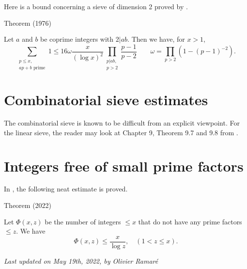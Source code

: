 \par 
Here is a bound concerning a sieve of dimension 2 proved by
\cite{Siebert*76}.
\par 
\begin{thm}{Theorem (1976)}

Let $a$ and $b$ be coprime integers with $2|ab$. Then we have, for $x>1$,
$$
\sum_{\substack{p\le x,\\ \text{$ap+b$ prime}}}1
\le 16 \omega\frac{x}{(\log x)^2}\prod_{\substack{p|ab,\\ p >
2}}\frac{p-1}{p-2}
\qquad \omega=\prod_{p > 2}(1-(p-1)^{-2}).
$$
\end{thm}



\section{Combinatorial sieve estimates}


The combinatorial sieve is known to be difficult from an explicit
viewpoint. For the linear sieve, the reader may look at Chapter 9,
Theorem 9.7 and 9.8 from
\cite{Nathanson*96-2}.


\section{Integers free of small prime factors}


In
\cite{Fan*22}, 
the following neat estimate is proved.
\par 
\begin{thm}{Theorem (2022)}

Let $\Phi(x,z)$ be the number of integers $\le x$ that do not have any
prime factors $\le z$. We have
$$
\Phi(x,z)\le \frac{x}{\log z},
\quad(1 < z\le x).
$$
\end{thm}







  
\begin{flushright}\small\sl{}   Last updated on May 19th, 2022, by Olivier Ramar\'e
 \end{flushright}














